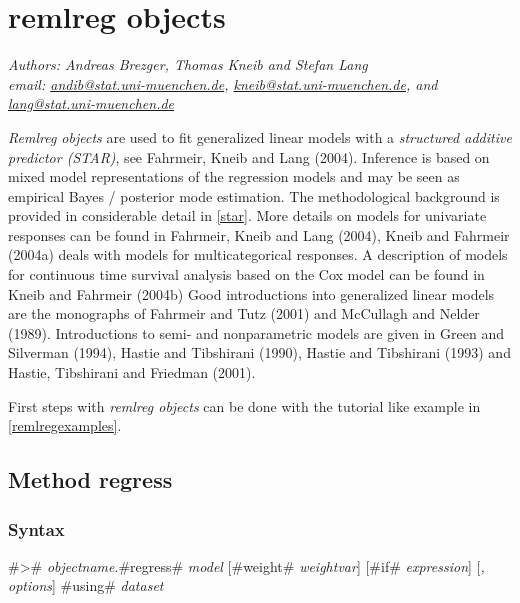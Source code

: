 \chapter{remlreg objects}\normalsize
\label{remlreg} 

{\em Authors: Andreas Brezger, Thomas Kneib and Stefan Lang} \\
{\em email:
\href{mailto:andib@stat.uni-muenchen.de}{andib@stat.uni-muenchen.de},
\href{mailto:kneib@stat.uni-muenchen.de}{kneib@stat.uni-muenchen.de},
and
\href{mailto:lang@stat.uni-muenchen.de}{lang@stat.uni-muenchen.de}} \\
\vspace{0.3cm}

{\em Remlreg objects} are used to fit generalized linear models
with a {\em structured additive predictor (STAR)}, see Fahrmeir,
Kneib and Lang (2004). Inference is based on mixed model
representations of the regression models and may be seen as
empirical Bayes / posterior mode estimation. The methodological
background is provided in considerable detail in \autoref{star}.
More details on models for univariate responses can be found in
Fahrmeir, Kneib and Lang (2004), Kneib and Fahrmeir (2004a) deals
with models for multicategorical responses. A description of
models for continuous time survival analysis based on the Cox
model can be found in Kneib and Fahrmeir (2004b) Good
introductions into generalized linear models are the monographs of
Fahrmeir and Tutz (2001) and McCullagh and Nelder (1989).
Introductions to semi- and nonparametric models are given in Green
and Silverman (1994), Hastie and Tibshirani (1990), Hastie and
Tibshirani (1993) and Hastie, Tibshirani and Friedman (2001).

First steps with {\em remlreg objects} can be done with the
tutorial like example in \autoref{remlregexamples}.

\section{Method regress}
\label{remlregregress}

\subsection{Syntax}
\label{remlregregresssyntax}

 #># {\em objectname}.#regress# {\em model} [#weight# {\em weightvar}] [#if# {\em expression}] [{\em , options}] #using# {\em dataset}

